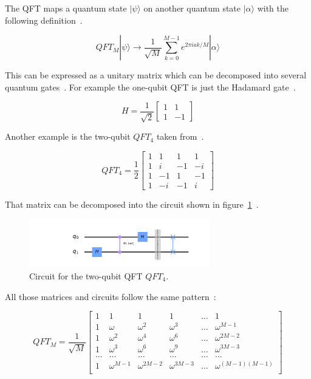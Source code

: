 The QFT maps a quantum state \(|\psi\rangle\) on another quantum state \(|\alpha\rangle\) with the following definition~\cite[p. 1]{Weinstein_2001}.

\[
    QFT_M|\psi\rangle \rightarrow \frac{1}{\sqrt{M}} \sum_{k=0}^{M-1} e^{2 \pi i a k/M} |\alpha\rangle
\]

This can be expressed as a unitary matrix which can be decomposed into several quantum gates~\cite[p. 2]{Weinstein_2001}.
For example the one-qubit QFT is just the Hadamard gate~\cite{QiskitTBQFT}.

\[
    H = \frac{1}{\sqrt{2}}
    \begin{bmatrix}
        1 & 1 \\
        1 & -1
    \end{bmatrix}
\]

Another example is the two-qubit \(QFT_4\) taken from~.

\[
    QFT_4 = \frac{1}{2}
    \begin{bmatrix}
        1 & 1 & 1 & 1 \\
        1 & i & -1 & -i \\
        1 & -1 & 1 & -1 \\
        1 & -i & -1 & i
    \end{bmatrix}
\]

That matrix can be decomposed into the circuit shown in figure~\ref{fig:qft4-circuit}~\cite{QiskitTBQFT}.

\begin{figure}[H]
    \centering
    \includegraphics[width=0.7\textwidth]{res/qft4_circuit.pdf}
    \caption{Circuit for the two-qubit QFT \(QFT_4\).}
    \label{fig:qft4-circuit}
\end{figure}

\clearpage

All those matrices and circuits follow the same pattern~\cite{Yin2020Jun}:

\[
    QFT_M =
    \frac{1}{\sqrt{M}}
    \begin{bmatrix}
        1 & 1 & 1 & 1 & \ldots & 1 \\
        1 & \omega & \omega^2 & \omega^3 & \ldots & \omega^{M-1} \\
        1 & \omega^2 & \omega^4 & \omega^6 & \ldots & \omega^{2M-2} \\
        1 & \omega^3 & \omega^6 & \omega^9 & \ldots & \omega^{3M-3} \\
        \ldots & \ldots & \ldots & \ldots & \ldots & \ldots \\
        1 & \omega^{M-1} & \omega^{2M-2} & \omega^{3M-3} & \ldots & \omega^{(M-1)(M-1)} \\
    \end{bmatrix}
\]

